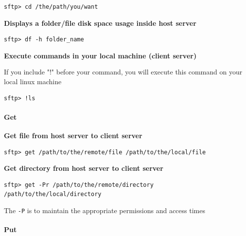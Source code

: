 \documentclass{article}
\newenvironment{blocktemplateI}[1]{%
    \tcolorbox[beamer,%
    noparskip,breakable,
    colframe=Violet,%
    colbacklower=Black,%
    title=#1]}%
    {\endtcolorbox}
\newenvironment{codetemplate}[1][]{%
  \mybasecolorbox[#1]
  \itshape
}{%
  \endmybasecolorbox
}
\begin{document}
\begin{codetemplate}{}
\begin{verbatim}
sftp> cd /the/path/you/want
\end{verbatim}
\end{codetemplate}

\textbf{Displays a folder/file disk space usage inside host server}
\begin{codetemplate}{}
\begin{verbatim}
sftp> df -h folder_name
\end{verbatim}
\end{codetemplate}

\textbf{Execute commands in your local machine (client server)}

If you include "!" before your command, you will execute this command on your local linux machine
\begin{codetemplate}{}
\begin{verbatim}
sftp> !ls
\end{verbatim}
\end{codetemplate}

\paragraph{Get}

\textbf{Get file from host server to client server}
\begin{codetemplate}{}
\begin{verbatim}
sftp> get /path/to/the/remote/file /path/to/the/local/file
\end{verbatim}
\end{codetemplate}

\textbf{Get directory from host server to client server}
\begin{codetemplate}{}
\begin{verbatim}
sftp> get -Pr /path/to/the/remote/directory /path/to/the/local/directory
\end{verbatim}
\end{codetemplate}

\begin{blocktemplateI}{NOTE}
The \verb|-P| is to maintain the appropriate permissions and access times
\end{blocktemplateI}

\paragraph{Put}
\end{document}
